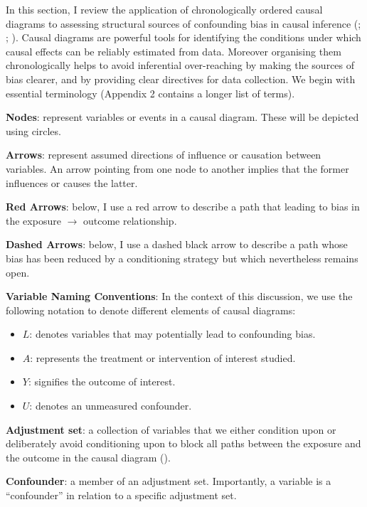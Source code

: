 \documentclass[
  singlecolumn,
  9pt]{article}
\providecommand{\tightlist}{%
  \setlength{\itemsep}{0pt}\setlength{\parskip}{0pt}}\usepackage{longtable,booktabs,array}
\begin{document}
In this section, I review the application of chronologically ordered
causal diagrams to assessing structural sources of confounding bias in
causal inference (; ;
). Causal diagrams are
powerful tools for identifying the conditions under which causal effects
can be reliably estimated from data. Moreover organising them
chronologically helps to avoid inferential over-reaching by making the
sources of bias clearer, and by providing clear directives for data
collection. We begin with essential terminology (Appendix 2 contains a
longer list of terms).

\textbf{Nodes}: represent variables or events in a causal diagram. These
will be depicted using circles.

\textbf{Arrows}: represent assumed directions of influence or causation
between variables. An arrow pointing from one node to another implies
that the former influences or causes the latter.

\textbf{Red Arrows}: below, I use a red arrow to describe a path that
leading to bias in the exposure \(\to\) outcome relationship.

\textbf{Dashed Arrows}: below, I use a dashed black arrow to describe a
path whose bias has been reduced by a conditioning strategy but which
nevertheless remains open.

\textbf{Variable Naming Conventions}: In the context of this discussion,
we use the following notation to denote different elements of causal
diagrams:

\begin{itemize}
\tightlist
\item
  \(L\): denotes variables that may potentially lead to confounding
  bias.
\item
  \(A\): represents the treatment or intervention of interest studied.
\item
  \(Y\): signifies the outcome of interest.
\item
  \(U\): denotes an unmeasured confounder.
\end{itemize}

\textbf{Adjustment set}: a collection of variables that we either
condition upon or deliberately avoid conditioning upon to block all
paths between the exposure and the outcome in the causal diagram
().

\textbf{Confounder}: a member of an adjustment set. Importantly, a
variable is a ``confounder'' in relation to a specific adjustment set.
\end{document}
